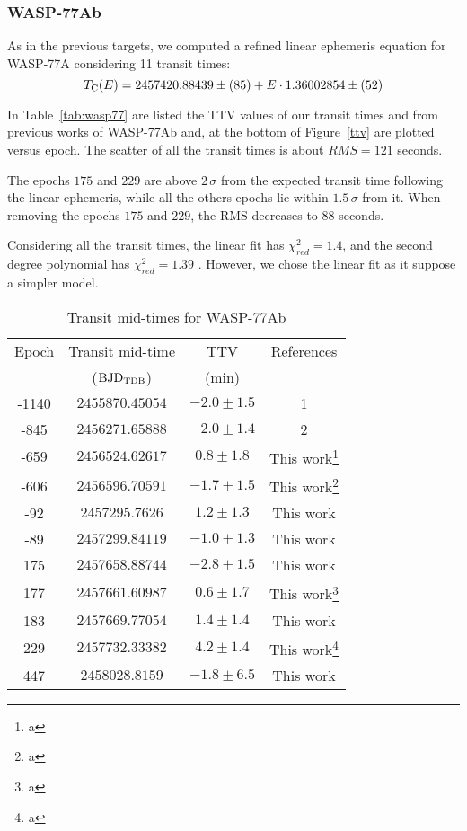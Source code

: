 \subsubsection{WASP-77Ab}

As in the previous targets, we computed a refined linear ephemeris equation for WASP-77A considering 11 transit times:
\begin{equation} \label{eq1_w77}
T_{\rm C}(E)=2457420.88439\pm(85)+E \cdot 1.36002854\pm(52)
\end{equation}

In Table~\ref{tab:wasp77} are listed the TTV values of our transit times and from previous works \citep{Turner2016,Maxted2013} of WASP-77Ab and, at the bottom of Figure~\ref{ttv} are plotted versus epoch. The scatter of all the transit times is about $RMS=121$ seconds. 

The epochs $175$ and $229$ are above $2\,\sigma$ from the expected transit time following the linear ephemeris, while all the others epochs lie within $1.5\,\sigma$ from it. When removing the epochs $175$ and $229$, the RMS decreases to 88 seconds. 

Considering all the transit times, the linear fit has $\chi^{2}_{red}=1.4$, and the second degree polynomial has $\chi^{2}_{red}=1.39$ . However, we chose the linear fit as it suppose a simpler model.

\begin{table}
\caption{Transit mid-times for WASP-77Ab}
\label{times_wasp77}
\centering
\begin{tabular}{cccc}
\hline \hline
Epoch & Transit mid-time & TTV & References\\
      & (${\rm BJD_{TDB}}$) & (min) &  \\
\hline
-1140 & $2455870.45054$ & $-2.0\pm1.5$ & 1 \\
-845 & $2456271.65888$ & $-2.0\pm1.4$ & 2 \\
-659 & $2456524.62617$ & $0.8\pm1.8$ & This work\footnote{a} \\
-606 & $2456596.70591$ & $-1.7\pm1.5$  & This work\footnote{a}  \\
-92 & $2457295.7626$  & $1.2\pm1.3$& This work \\
-89 & $2457299.84119$ &  $-1.0\pm1.3$ & This work \\
175 & $2457658.88744$ & $-2.8\pm1.5$ & This work\\
177 & $2457661.60987$   & $0.6\pm1.7$ & This work\footnote{a} \\
183 & $2457669.77054$ &  $1.4\pm1.4$  & This work  \\
229 & $2457732.33382$ & $4.2\pm1.4$& This work\footnote{a} \\
447 & $2458028.8159$  & $-1.8\pm6.5$ & This work\\ 
\hline
\end{tabular}
\end{table}
